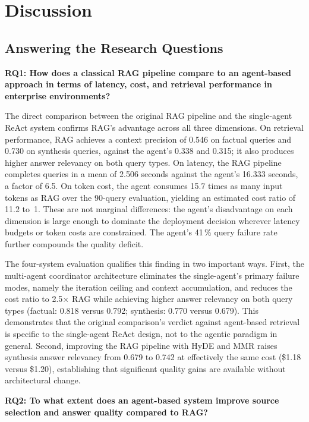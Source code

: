
\chapter{Discussion}
\label{ch:discussion}

\section{Answering the Research Questions}
\label{sec:rqs}

\textbf{RQ1: How does a classical RAG pipeline compare to an agent-based approach in terms of latency, cost, and retrieval performance in enterprise environments?}

The direct comparison between the original RAG pipeline and the single-agent ReAct system confirms RAG's advantage across all three dimensions. On retrieval performance, RAG achieves a context precision of 0.546 on factual queries and 0.730 on synthesis queries, against the agent's 0.338 and 0.315; it also produces higher answer relevancy on both query types. On latency, the RAG pipeline completes queries in a mean of 2.506 seconds against the agent's 16.333 seconds, a factor of 6.5. On token cost, the agent consumes 15.7 times as many input tokens as RAG over the 90-query evaluation, yielding an estimated cost ratio of 11.2 to~1. These are not marginal differences: the agent's disadvantage on each dimension is large enough to dominate the deployment decision wherever latency budgets or token costs are constrained. The agent's 41\,\% query failure rate further compounds the quality deficit.

The four-system evaluation qualifies this finding in two important ways. First, the multi-agent coordinator architecture eliminates the single-agent's primary failure modes, namely the iteration ceiling and context accumulation, and reduces the cost ratio to 2.5$\times$ RAG while achieving higher answer relevancy on both query types (factual: 0.818 versus 0.792; synthesis: 0.770 versus 0.679). This demonstrates that the original comparison's verdict against agent-based retrieval is specific to the single-agent ReAct design, not to the agentic paradigm in general. Second, improving the RAG pipeline with HyDE and MMR raises synthesis answer relevancy from 0.679 to 0.742 at effectively the same cost (\$1.18 versus \$1.20), establishing that significant quality gains are available without architectural change.

\textbf{RQ2: To what extent does an agent-based system improve source selection and answer quality compared to RAG?}

